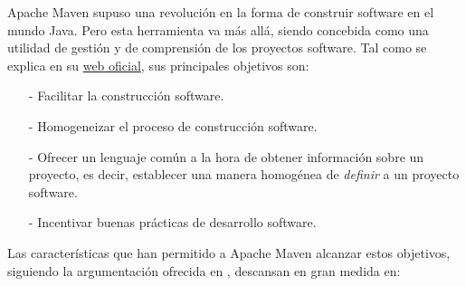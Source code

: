 \documentclass[a4paper,12pt,twoside,openright]{report}
\begin{document}
    Apache Maven supuso una revolución en la forma de construir software en el mundo Java. Pero esta herramienta va más allá, siendo concebida como una utilidad de gestión y de comprensión de los proyectos software. Tal como se explica en su \href{https://maven.apache.org/what-is-maven.html}{web oficial}, sus principales objetivos son:
    
    \begin{itemize}
    	\item[-] Facilitar la construcción software.
    	\item[-] Homogeneizar el proceso de construcción software.
    	\item[-] Ofrecer un lenguaje común a la hora de obtener información sobre un proyecto, es decir, establecer una manera homogénea de \emph{definir} a un proyecto software.
    	\item[-] Incentivar buenas prácticas de desarrollo software.
    \end{itemize}
    
    Las características que han permitido a Apache Maven alcanzar estos objetivos, siguiendo la argumentación ofrecida en \cite{Sonatype2008}, descansan en gran medida en:
    
\end{document}
